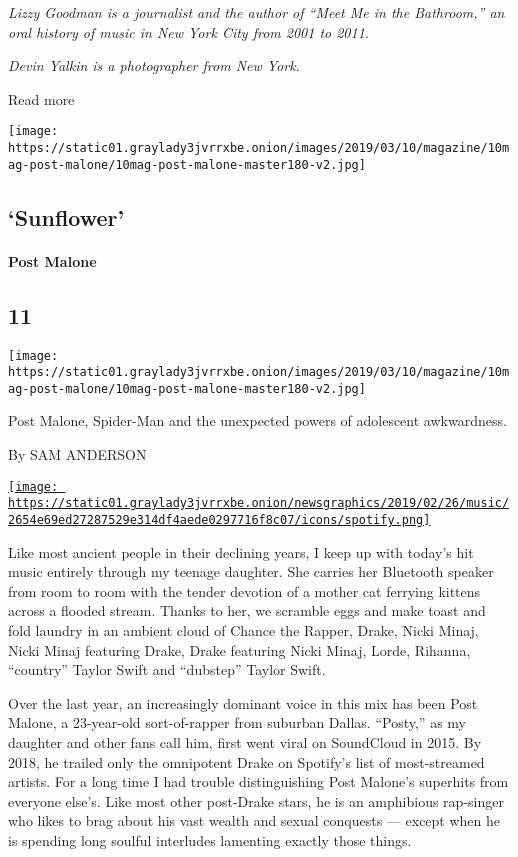 \emph{Lizzy Goodman is a journalist and the author of ``Meet Me in the
Bathroom,'' an oral history of music in New York City from 2001 to
2011.}

\emph{Devin Yalkin is a photographer from New York.}

Read more

\texttt{[image: https://static01.graylady3jvrrxbe.onion/images/2019/03/10/magazine/10mag-post-malone/10mag-post-malone-master180-v2.jpg]}

\hypertarget{---sunflower-}{%
\subsection{\texorpdfstring{ `Sunflower'
}{   `Sunflower' }}\label{---sunflower-}}

\hypertarget{post-malone}{%
\paragraph{Post Malone}\label{post-malone}}

\hypertarget{11}{%
\subsection{11}\label{11}}

\texttt{[image: https://static01.graylady3jvrrxbe.onion/images/2019/03/10/magazine/10mag-post-malone/10mag-post-malone-master180-v2.jpg]}

Post Malone, Spider-Man and the unexpected powers of adolescent
awkwardness.

By SAM ANDERSON

\href{https://open.spotify.com/track/3KkXRkHbMCARz0aVfEt68P}{\texttt{[image: https://static01.graylady3jvrrxbe.onion/newsgraphics/2019/02/26/music/2654e69ed27287529e314df4aede0297716f8c07/icons/spotify.png]}}

Like most ancient people in their declining years, I keep up with
today's hit music entirely through my teenage daughter. She carries her
Bluetooth speaker from room to room with the tender devotion of a mother
cat ferrying kittens across a flooded stream. Thanks to her, we scramble
eggs and make toast and fold laundry in an ambient cloud of Chance the
Rapper, Drake, Nicki Minaj, Nicki Minaj featuring Drake, Drake featuring
Nicki Minaj, Lorde, Rihanna, ``country'' Taylor Swift and ``dubstep''
Taylor Swift.

Over the last year, an increasingly dominant voice in this mix has been
Post Malone, a 23-year-old sort-of-rapper from suburban Dallas.
``Posty,'' as my daughter and other fans call him, first went viral on
SoundCloud in 2015. By 2018, he trailed only the omnipotent Drake on
Spotify's list of most-streamed artists. For a long time I had trouble
distinguishing Post Malone's superhits from everyone else's. Like most
other post-Drake stars, he is an amphibious rap-singer who likes to brag
about his vast wealth and sexual conquests --- except when he is
spending long soulful interludes lamenting exactly those things.

